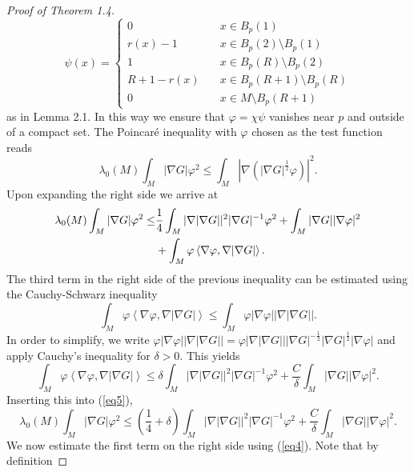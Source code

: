 \documentclass{amsart}
\theoremstyle{definition}
\theoremstyle{remark}
\numberwithin{equation}{section}
\begin{document}
\begin{proof}[Proof of Theorem 1.4]
\[
\psi(x) = 
\begin{cases}
    0                 & \quad x \in B_p(1) \\
    r(x) - 1          & \quad x \in B_p(2) \setminus B_p(1) \\
    1                 & \quad x \in B_p(R) \setminus B_p(2) \\
    R+1 - r(x)        & \quad x \in B_p(R+1) \setminus B_p(R) \\
    0                 & \quad x \in M \setminus B_p(R+1)
\end{cases}
\]
as in Lemma 2.1. In this way we ensure that $\varphi=\chi\psi$ vanishes near $p$ and outside of a compact set. The Poincar\'e inequality with $\varphi$ chosen as the test function reads
\begin{equation*}
\lambda_0(M)\int_M|\nabla G|\varphi^2\leq \int_M|\nabla(|\nabla G|^{\frac{1}{2}}\varphi)|^2.
\end{equation*}
Upon expanding the right side we arrive at 
\begin{align}\label{eq5}
        \lambda_0(M)\int_M|\nabla G|\varphi^2\leq &\frac{1}{4}\int_M|\nabla|\nabla G||^2|\nabla G|^{-1}\varphi^2+\int_M|\nabla G||\nabla \varphi|^2\notag\\
        &+\int_M\varphi\left<\nabla \varphi,\nabla|\nabla G|\right>.
\end{align}
The third term in the right side of the previous inequality can be estimated using the Cauchy-Schwarz inequality 
\begin{equation*}
\int_M\varphi\left<\nabla \varphi,\nabla|\nabla G|\right>\leq \int_M \varphi|\nabla \varphi||\nabla|\nabla G||.
\end{equation*}
In order to simplify, we write $\varphi|\nabla \varphi||\nabla|\nabla G||=\varphi |\nabla|\nabla G|||\nabla G|^{-\frac{1}{2}}|\nabla G|^{\frac{1}{2}}|\nabla \varphi|$ and apply Cauchy's inequality for $\delta>0$. This yields
\begin{equation*}
\int_M\varphi\left<\nabla \varphi,\nabla|\nabla G|\right>\leq \delta\int_M|\nabla|\nabla G||^2|\nabla G|^{-1}\varphi^2+\frac{C}{\delta}\int_M|\nabla G||\nabla \varphi|^2.
\end{equation*}
Inserting this into (\ref{eq5}), 
\begin{equation*}
\lambda_0(M)\int_M|\nabla G|\varphi^2\leq \left(\frac{1}{4}+\delta\right)\int_M|\nabla|\nabla G||^2|\nabla G|^{-1}\varphi^2+\frac{C}{\delta}\int_M|\nabla G||\nabla\varphi|^2.
\end{equation*}
We now estimate the first term on the right side using (\ref{eq4}). Note that by definition

\end{proof}
\end{document}
